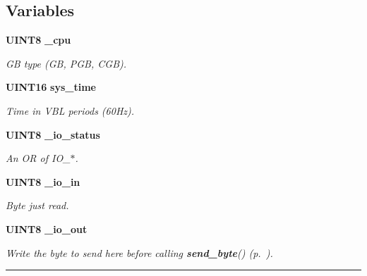 \subsection*{Variables}
\begin{CompactItemize}
\item 
\label{gb.h_a101}
{\bf UINT8} {\bf \_\-cpu}
\begin{CompactList}\small\item\em GB type (GB, PGB, CGB).\item\end{CompactList}

\item 
\label{gb.h_a102}
{\bf UINT16} {\bf sys\_\-time}
\begin{CompactList}\small\item\em Time in VBL periods (60Hz).\item\end{CompactList}

\item 
\label{gb.h_a103}
{\bf UINT8} {\bf \_\-io\_\-status}
\begin{CompactList}\small\item\em An OR of IO\_\-$\ast$.\item\end{CompactList}

\item 
\label{gb.h_a104}
{\bf UINT8} {\bf \_\-io\_\-in}
\begin{CompactList}\small\item\em Byte just read.\item\end{CompactList}

\item 
{\bf UINT8} {\bf \_\-io\_\-out}
\begin{CompactList}\small\item\em Write the byte to send here before calling {\bf send\_\-byte}() {\rm (p.~\pageref{gb.h_a65})}.\item\end{CompactList}

\end{CompactItemize}
\vspace{0.4cm}\hrule\vspace{0.2cm}
